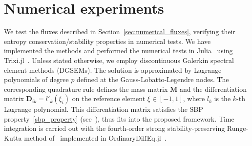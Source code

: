 \documentclass[]{scrartcl}
\newcommand{\mtx}[1]{\boldsymbol{#1}}
\theoremstyle{definition}
\begin{document}
\section{Numerical experiments}
\label{sec:numerical_experiments}
We test the fluxes described in Section~\ref{sec:numerical_fluxes}, verifying their entropy conservation/stability properties in numerical tests.
We have implemented the methods and performed the numerical tests in Julia~\cite{bezanson2017julia} using Trixi.jl~\cite{ranocha2022adaptive,schlottkelakemper2021purely}.
Unless stated otherwise, we employ discontinuous Galerkin spectral element methods (DGSEMs).
The solution is approximated by Lagrange polynomials of degree $p$ defined at the Gauss-Lobatto-Legendre nodes.
The corresponding quadrature rule defines the mass matrix $\mtx{M}$ and the differentiation matrix $\mtx{D}_{ik} = l'_k(\xi_i)$ on the reference element $\xi \in [-1, 1]$, where $l_k$ is the $k$-th Lagrange polynomial.
This differentiation matrix satisfies the SBP property~\eqref{sbp_property} (see~\cite{gassner2013skew}), thus fits into the proposed framework.
Time integration is carried out with the fourth-order strong stability-preserving Runge-Kutta method of~\cite{kraaijevanger1991contractivity} implemented in OrdinaryDiffEq.jl~\cite{rackauckas2017differentialequations}.
\end{document}
